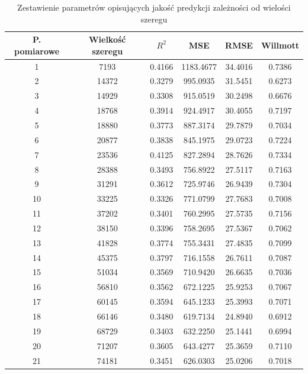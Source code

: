 \documentclass[10pt,a4paper]{article}
\begin{document}
\begin{table}[h!]
	\centering
	\begin{tabular}{|c|c|c|c|c|c|}
		\hline
		P. pomiarowe & Wielkość szeregu & $R^2$ & MSE & RMSE & Willmott \\
		\hline
		1  & 7193  & 0.4166 & 1183.4677 & 34.4016 & 0.7386 \\
		2  & 14372 & 0.3279 & 995.0935  & 31.5451 & 0.6273 \\
		3  & 14929 & 0.3308 & 915.0519  & 30.2498 & 0.6676 \\
		4  & 18768 & 0.3914 & 924.4917  & 30.4055 & 0.7197 \\
		5  & 18880 & 0.3773 & 887.3174  & 29.7879 & 0.7034 \\
		6  & 20877 & 0.3838 & 845.1975  & 29.0723 & 0.7224 \\
		7  & 23536 & 0.4125 & 827.2894  & 28.7626 & 0.7334 \\
		8  & 28388 & 0.3493 & 756.8922  & 27.5117 & 0.7163 \\
		9  & 31291 & 0.3612 & 725.9746  & 26.9439 & 0.7304 \\
		10 & 33225 & 0.3326 & 771.0799  & 27.7683 & 0.7008 \\
		11 & 37202 & 0.3401 & 760.2995  & 27.5735 & 0.7156 \\
		12 & 38150 & 0.3396 & 758.2695  & 27.5367 & 0.7062 \\
		13 & 41828 & 0.3774 & 755.3431  & 27.4835 & 0.7099 \\
		14 & 45375 & 0.3797 & 716.1558  & 26.7611 & 0.7087 \\
		15 & 51034 & 0.3569 & 710.9420  & 26.6635 & 0.7036 \\
		16 & 56810 & 0.3562 & 672.1225  & 25.9253 & 0.7067 \\
		17 & 60145 & 0.3594 & 645.1233  & 25.3993 & 0.7071 \\
		18 & 66146 & 0.3480 & 619.7134  & 24.8940 & 0.6912 \\
		19 & 68729 & 0.3403 & 632.2250  & 25.1441 & 0.6994 \\
		20 & 71207 & 0.3605 & 643.4277  & 25.3659 & 0.7110 \\
		21 & 74181 & 0.3451 & 626.0303  & 25.0206 & 0.7018 \\
		\hline
	\end{tabular}
	\caption{Zestawienie parametrów opisujących jakość predykcji  zależności od wielości szeregu}
	\label{table:scale_comparison}
\end{table}
\end{document}

